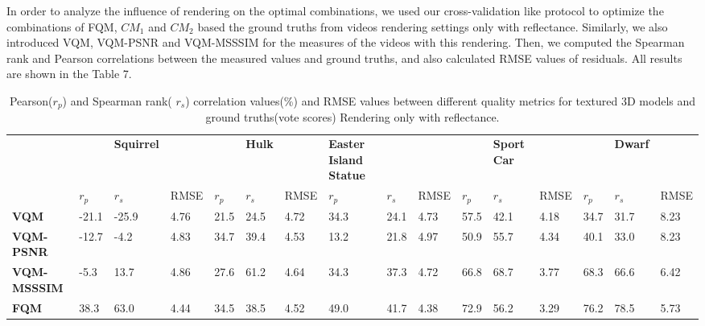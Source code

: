 In order to analyze the influence of rendering on the optimal combinations, we used our cross-validation like protocol to optimize the combinations of FQM, $CM_1$ and $CM_2$ based the ground truths from videos rendering settings only with reflectance. Similarly, we also introduced VQM, VQM-PSNR and VQM-MSSSIM for the measures of the videos with this rendering. Then, we computed the Spearman rank and Pearson correlations between the measured values and ground truths, and also calculated RMSE values of residuals. All results are shown in the Table 7.\\
\begin{table}[]
\centering
\caption{Pearson($r_p$) and Spearman rank( $r_s$) correlation values(\%) and RMSE values between different quality metrics for textured 3D models and ground truths(vote scores) Rendering only with reflectance.}
\label{my-label}
\begin{tabular}{llllllllllllllll}
                    & \textbf{}     & \textbf{Squirrel} & \textbf{}     & \textbf{}     & \textbf{Hulk} & \textbf{}     & \textbf{Easter Island Statue}     & \textbf{} & \textbf{}     & \textbf{}     & \textbf{Sport Car} & \textbf{}     & \textbf{}     & \textbf{Dwarf} &               \\
                     & $r_p$                & $r_s$           & RMSE & $r_p$                & $r_s$            & RMSE & $r_p$                & $r_s$            & RMSE &$r_p$                & $r_s$            & RMSE      & $r_p$                & $r_s$             & RMSE \\
\textbf{VQM}        & -21.1         & -25.9             & 4.76          & 21.5          & 24.5          & 4.72          & 34.3          & 24.1                          & 4.73          & 57.5          & 42.1               & 4.18          & 34.7          & 31.7           & 8.23          \\
\textbf{VQM-PSNR}   & -12.7         & -4.2              & 4.83          & 34.7          & 39.4          & 4.53          & 13.2          & 21.8                          & 4.97          & 50.9          & 55.7               & 4.34          & 40.1          & 33.0           & 8.23          \\
\textbf{VQM-MSSSIM} & -5.3          & 13.7              & 4.86          & 27.6          & 61.2          & 4.64          & 34.3          & 37.3                          & 4.72          & 66.8          & 68.7               & 3.77          & 68.3          & 66.6           & 6.42          \\
\textbf{FQM}        & 38.3          & 63.0              & 4.44          & 34.5          & 38.5          & 4.52          & 49.0          & 41.7                          & 4.38          & 72.9          & 56.2               & 3.29          & 76.2          & 78.5           & 5.73          \\

\end{tabular}
\end{table}
